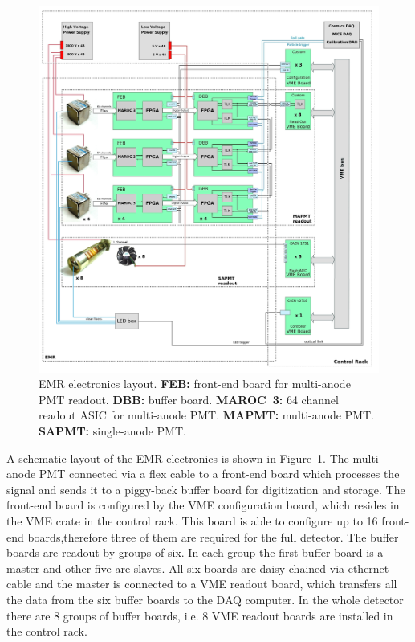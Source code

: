 \documentclass[a4paper,11pt]{article}
\begin{document}
\begin{figure}[htp!]
 \centering
 \includegraphics[width=\textwidth]{./EMR_electronics_layout}
 \caption[EMR electronics layout.]{EMR electronics layout. {\bf FEB:} front-end board for multi-anode PMT readout. {\bf DBB:} buffer board.
 {\bf MAROC~3:} 64 channel readout ASIC for multi-anode PMT. {\bf MAPMT:} multi-anode PMT. {\bf SAPMT:} single-anode PMT.}
 \label{fig:EMR_electronics_layout}
\end{figure}

A schematic layout of the EMR electronics is shown in Figure~\ref{fig:EMR_electronics_layout}. The multi-anode PMT connected via a flex cable
to a front-end board which processes the signal and sends it to a piggy-back buffer board for digitization and storage. The front-end board is
configured by the VME configuration board, which resides in the VME crate in the control rack. This board is able to configure up to 16 front-end
boards,therefore three of them are required for the full detector. The buffer boards are readout by groups of six. In each group the first buffer
board is a master and other five are slaves. All six boards are daisy-chained via ethernet cable and the master is connected to a VME readout
board, which transfers all the data from the six buffer boards to the DAQ computer. In the whole detector there are 8 groups of buffer boards,
i.e. 8 VME readout boards are installed in the control rack. 
\end{document}
